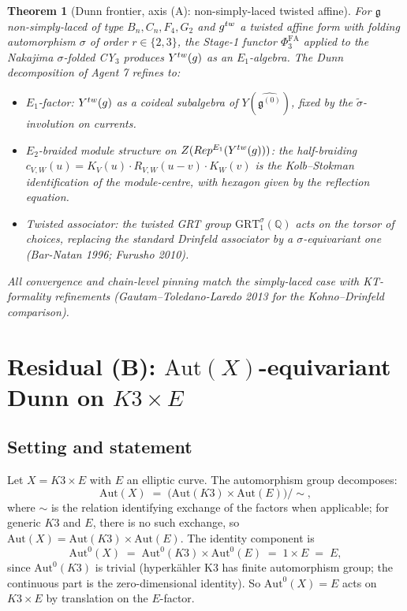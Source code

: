 \documentclass[11pt]{article}
\newtheorem{theorem}{Theorem}[section]
\newcommand{\Eone}{E_{1}}
\newcommand{\Etwo}{E_{2}}
\newcommand{\PhiFA}{\Phi^{\mathrm{FA}}}
\newcommand{\Q}{\mathbb{Q}}
\newcommand{\cZ}{\mathcal{Z}}
\newcommand{\Rep}{\mathrm{Rep}}
\newcommand{\Aut}{\mathrm{Aut}}
\newcommand{\frakg}{\mathfrak{g}}
\begin{document}
\begin{theorem}[Dunn frontier, axis (A): non-simply-laced twisted
  affine]
  \label{thm:dunn-frontier-A-bundle}
  For $\frakg$ non-simply-laced of type $B_n, C_n, F_4, G_2$ and
  $\widehat\frakg^{\mathrm{tw}}$ a twisted affine form with folding
  automorphism $\sigma$ of order $r \in \{2, 3\}$, the Stage-1
  functor $\PhiFA_3$ applied to the Nakajima $\sigma$-folded CY$_3$
  produces $Y^{\mathrm{tw}}(\widehat\frakg)$ as an $\Eone$-algebra.
  The Dunn decomposition of Agent 7 refines to:
  \begin{itemize}
  \item $\Eone$-factor: $Y^{\mathrm{tw}}(\widehat\frakg)$ as a coideal
    subalgebra of $Y(\widehat{\frakg^{(0)}})$, fixed by the
    $\widetilde\sigma$-involution on currents.
  \item $\Etwo$-braided module structure on
    $\cZ(\Rep^{\Eone}(Y^{\mathrm{tw}}(\widehat\frakg)))$: the
    half-braiding $c_{V, W}(u) = K_V(u) \cdot R_{V, W}(u - v) \cdot
    K_W(v)$ is the Kolb--Stokman identification of the module-centre,
    with hexagon given by the reflection equation.
  \item Twisted associator: the twisted GRT group
    $\mathrm{GRT}_1^{\sigma}(\Q)$ acts on the torsor of choices,
    replacing the standard Drinfeld associator by a
    $\sigma$-equivariant one (Bar-Natan 1996; Furusho 2010).
  \end{itemize}
  All convergence and chain-level pinning match the simply-laced case
  with KT-formality refinements (Gautam--Toledano-Laredo 2013 for the
  Kohno--Drinfeld comparison).
\end{theorem}

\section{Residual (B): $\Aut(X)$-equivariant Dunn on $K3 \times E$}
\label{sec:residual-B-aut-equivariant}

\subsection{Setting and statement}

Let $X = K3 \times E$ with $E$ an elliptic curve. The automorphism
group decomposes:
\[
  \Aut(X) \;=\; \bigl(\Aut(K3) \times \Aut(E)\bigr) / \sim,
\]
where $\sim$ is the relation identifying exchange of the factors when
applicable; for generic $K3$ and $E$, there is no such exchange, so
$\Aut(X) = \Aut(K3) \times \Aut(E)$. The identity component is
\[
  \Aut^0(X) \;=\; \Aut^0(K3) \times \Aut^0(E) \;=\; 1 \times E \;=\; E,
\]
since $\Aut^0(K3)$ is trivial (hyperk\"ahler K3 has finite
automorphism group; the continuous part is the zero-dimensional
identity). So $\Aut^0(X) = E$ acts on $K3 \times E$ by translation on
the $E$-factor.
\end{document}
